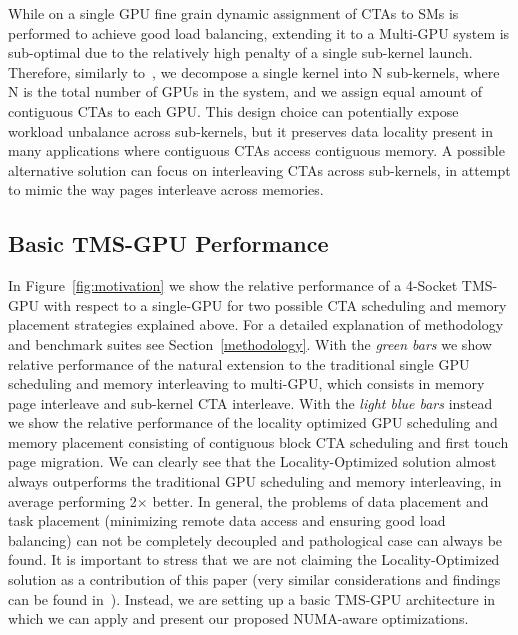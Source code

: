 While on a single GPU fine grain dynamic assignment of CTAs to SMs is performed
to achieve good load balancing, extending it to a Multi-GPU system is
sub-optimal due to the relatively high penalty of a single sub-kernel launch.
Therefore, similarly to~\cite{Cabezas2015}, we decompose a single kernel into N
sub-kernels, where N is the total number of GPUs in the system, and we assign
equal amount of contiguous CTAs to each GPU.  This design choice can potentially
expose workload unbalance across sub-kernels, but it preserves data locality
present in many applications where contiguous CTAs access contiguous memory. A
possible alternative solution can focus on interleaving CTAs across
sub-kernels, in attempt to mimic the way pages interleave across memories. 

\subsection{Basic TMS-GPU Performance} 
In Figure~\ref{fig:motivation} we show the relative performance of a 4-Socket 
TMS-GPU with respect to a single-GPU for two possible CTA scheduling and 
memory placement strategies explained above. For a detailed explanation of 
methodology and benchmark suites see Section~\ref{methodology}. With the 
\emph{green bars} we show relative performance of the natural extension to 
the traditional single GPU scheduling and memory interleaving to multi-GPU, 
which consists in memory page interleave and sub-kernel CTA interleave. With 
the \emph{light blue bars} instead we show the relative performance of the 
locality optimized GPU scheduling and memory placement consisting of 
contiguous block CTA scheduling and first touch page migration. We can 
clearly see that the Locality-Optimized solution almost always outperforms 
the traditional GPU scheduling and memory interleaving, in average performing 
2$\times$ better. In general, the problems of data placement and task 
placement (minimizing remote data access and ensuring good load balancing) 
can not be completely decoupled and pathological case can always be found. It 
is important to stress that we are not claiming the Locality-Optimized 
solution as a contribution of this paper (very similar considerations and 
findings can be found in~\cite{Cabezas2015, Arunkumar2017}). Instead, we are 
setting up a basic TMS-GPU architecture in which we can apply and present our 
proposed NUMA-aware optimizations.

